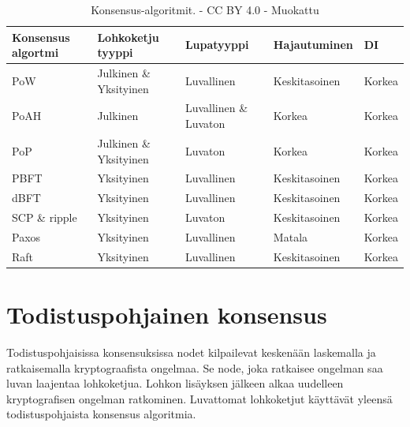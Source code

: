 \documentclass[utf8,bachelor]{gradu3}
\begin{document}
\begin{table}[ht]\centering
  \begin{tabular}{lllll}
    \toprule
    Konsensus algortmi & Lohkoketju tyyppi & Lupatyyppi & Hajautuminen & DI \\
    \midrule
    PoW     & Julkinen \& Yksityinen 
            & Luvallinen 
            & Keskitasoinen 
            & Korkea \\
            
    PoAH    & Julkinen 
            & Luvallinen \& Luvaton 
            & Korkea 
            & Korkea \\
            
    PoP     & Julkinen \& Yksityinen 
            & Luvaton
            & Korkea 
            & Korkea \\
    \midrule
    PBFT    & Yksityinen  
            & Luvallinen
            & Keskitasoinen 
            & Korkea \\
            
    dBFT    & Yksityinen  
            & Luvallinen 
            & Keskitasoinen 
            & Korkea \\
            
    SCP \& ripple   
            & Yksityinen  
            & Luvaton
            & Keskitasoinen 
            & Korkea \\
    \midrule
    Paxos
            & Yksityinen
            & Luvallinen
            & Matala
            & Korkea \\
    Raft
            & Yksityinen
            & Luvallinen
            & Keskitasoinen
            & Korkea \\

    \bottomrule
  \end{tabular}
  \caption{Konsensus-algoritmit. \cite{zarrin2021blockchain} - CC BY 4.0 - Muokattu}
  \label{tbl:konsensus}
\end{table}

\section{Todistuspohjainen konsensus}
Todistuspohjaisissa konsensuksissa nodet kilpailevat keskenään laskemalla ja ratkaisemalla kryptograafista ongelmaa.
Se node, joka ratkaisee ongelman saa luvan laajentaa lohkoketjua.
Lohkon lisäyksen jälkeen alkaa uudelleen kryptografisen ongelman ratkominen.
Luvattomat lohkoketjut käyttävät yleensä todistuspohjaista konsensus algoritmia.
\end{document}
